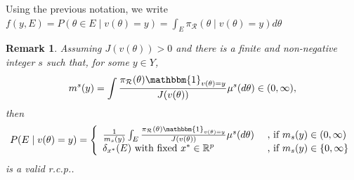 \documentclass[10pt,fleqn]{article}
\newtheorem{remark}{Remark}
\newcommand{\be}{\begin{equation}\begin{aligned}}
\newcommand{\ee}{\end{aligned}\end{equation}}
\newcommand{\bb}[1]{\mathbb{#1}}
\newcommand{\mc}[1]{\mathcal{#1}}
\DeclareMathOperator{\1}{\mathbbm{1}}
\begin{document}
Using the previous notation, we write $f(y,E)= P(\theta\in E\mid
v(\theta)=y)=\int_E \pi_{\mc R}(\theta
\mid v(\theta)=y) d\theta$

\begin{remark}
Assuming $J(v(\theta))> 0$ and there is a finite and
non-negative integer $s$ such
that, for some $y\in Y$,
\be
m^{s}(y)=\int \frac{\pi_{\mc
R}(\theta)
\mathbbm{1}_{v({\theta})=y}}{J(v(\theta))}\mu^s(d\theta)\in(0,\infty),
\ee
then
\begin{equation}
P(E\mid v(\theta)=y)=\left\{\begin{array}{ll}  \frac{1}{m_s(y)}\int_{E } \frac{\pi_{\mc
R}(\theta) \mathbbm{1}_{v({\theta})=y}}{J(v(\theta))}\mu^s(d\theta)
& \text{  , if }m_s(y)\in(0,\infty) \\
\delta_{x^*}(E) \text{ with fixed } x^*\in \bb R^p
& \text{  , if }m_s(y)\in\{0,\infty\} \\
\end{array}\right.
\end{equation}
is a valid r.c.p..
\end{remark}
\end{document}
